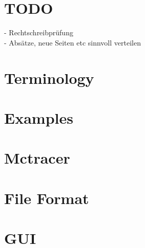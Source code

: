 \documentclass{scrartcl}
\begin{document}
\maketitle
\tableofcontents
\newpage

\section{TODO}
- Rechtschreibprüfung \\
- Absätze, neue Seiten etc sinnvoll verteilen \\

\section{Terminology} 
\section{Examples} 
\section{Mctracer} 
\section{File Format} 
\section{GUI} 
\end{document}
